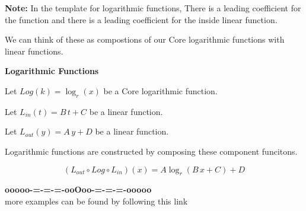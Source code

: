 \documentclass{ximera}
\begin{document}
\textbf{Note:}  In the template for logarithmic functions, There is a leading coefficient for the function and there is a leading coefficient for the inside linear function. 



We can think of these as compostions of our Core logarithmic functions with linear functions.


\begin{idea} \textbf{\textcolor{blue!55!black}{Logarithmic Functions}}


Let $Log(k) = \log_r(x) $ be a Core logarithmic function.

Let $L_{in}(t) = B \, t + C$ be a linear function.

Let $L_{out}(y) = A \, y + D$ be a linear function.


Logarithmic functions are constructed by composing these component funcitons.


\[
(L_{out} \circ Log \circ L_{in})(x) = A \log_r(B \,x + C) + D
\]




\end{idea}







\begin{center}
\textbf{\textcolor{green!50!black}{ooooo-=-=-=-ooOoo-=-=-=-ooooo}} \\

more examples can be found by following this link\\ 

\end{center}
\end{document}
